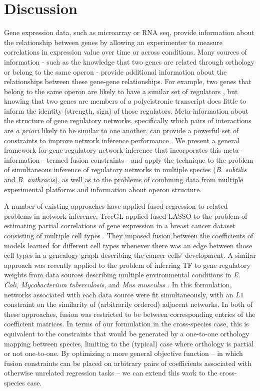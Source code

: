 \documentclass[11pt]{article}
\begin{document}
\section{Discussion}
Gene expression data, such as microarray or RNA seq, provide information about the relationship between genes by allowing an experimenter to measure correlations in expression value over time or across conditions. Many sources of information - such as the knowledge that two genes are related through orthology or belong to the same operon - provide additional information about the relationships between these gene-gene relationships. 
For example,  two genes that belong to the same operon are likely to have a similar set of regulators \cite{lawrence_shared_2002}, but knowing that two genes are members of a polycistronic transcript does little to inform the identity (strength, sign) of those regulators. 
Meta-information about the structure of gene regulatory networks, specifically which pairs of interactions are \textit{a priori} likely to be similar to one another, can provide a powerful set of constraints to improve network inference performance \cite{roy_arboretum:_2013, pierson_sharing_2015}. 
We present a general framework for gene regulatory network inference that incorporates this meta-information - termed fusion constraints - and apply the technique to the problem of simultaneous inference of regulatory networks in multiple species (\textit{B. subtilis} and \textit{B. anthracis}), as well as to the problems of combining data from multiple experimental platforms and information about operon structure.
    
A number of existing approaches have applied fused regression to related problems in network inference. TreeGL applied fused LASSO to the problem of estimating partial correlations of gene expression in a breast cancer dataset consisting of multiple cell types \cite{parikh2011treegl}. They imposed fusion between the coefficients of models learned for different cell types whenever there was an edge between those cell types in a genealogy graph describing the cancer cells' development. A similar approach was recently applied to the problem of inferring TF to gene regulatory weights from data sources describing multiple environmental conditions in \textit{E. Coli}, \textit{Mycobacterium tuberculosis}, and \textit{Mus musculus} \cite{omranian2016gene}. In this formulation, networks associated with each data source were fit simultaneously, with an $L1$ constraint on the similarity of (arbitrarily ordered) adjacent networks. In both of these approaches, fusion was restricted to be between corresponding entries of the coefficient matrices. In terms of our formulation in the cross-species case, this is equivalent to the constraints that would be generated by a one-to-one orthology mapping between species, limiting to the (typical) case where orthology is partial or not one-to-one. By optimizing a more general objective function -- in which fusion constraints can be placed on arbitrary pairs of coefficients associated with otherwise unrelated regression tasks -- we can extend this work to the cross-species case.
\end{document}
